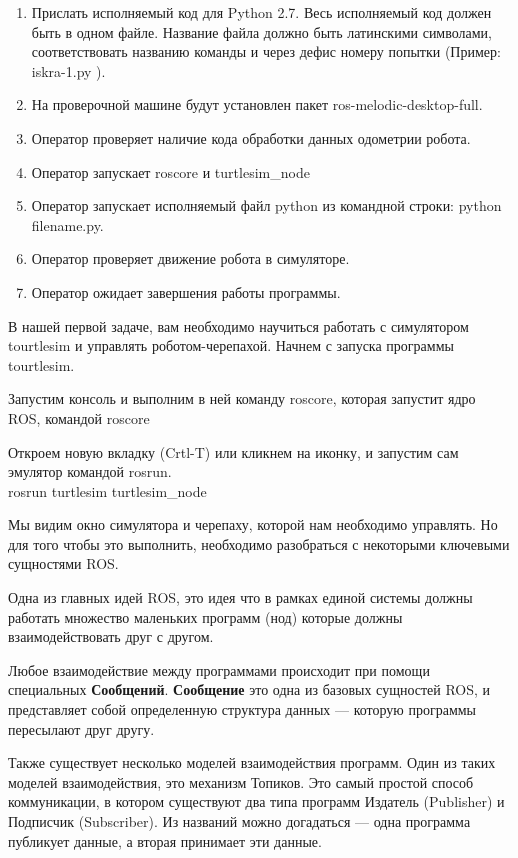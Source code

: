 \begin{enumerate}
    \item Прислать исполняемый код для Python 2.7. Весь исполняемый код должен быть в одном файле. Название файла должно быть латинскими символами, соответствовать названию команды и через дефис номеру попытки (Пример:  iskra-1.py ).
    \item На проверочной машине будут установлен пакет ros-melodic-desktop-full.
    \item Оператор проверяет наличие кода обработки данных одометрии робота.
    \item Оператор запускает roscore и turtlesim\_node
    \item Оператор запускает исполняемый файл python из командной строки: python filename.py.
    \item Оператор проверяет движение робота в симуляторе.
    \item Оператор ожидает завершения работы программы.
\end{enumerate}

\solutionSection

В нашей первой задаче, вам необходимо научиться работать с симулятором \linebreak tourtlesim и управлять роботом-черепахой. Начнем с запуска программы tourtlesim.

Запустим консоль и выполним в ней команду roscore, которая запустит ядро ROS, командой roscore

Откроем новую вкладку (Crtl-T) или кликнем на иконку, и запустим сам эмулятор командой rosrun.\\
rosrun turtlesim turtlesim\_node

Мы видим окно симулятора и черепаху, которой нам необходимо управлять. Но для того чтобы это выполнить, необходимо разобраться с некоторыми ключевыми сущностями ROS.

Одна из главных идей ROS, это идея что в рамках единой системы должны работать множество маленьких программ (нод) которые должны взаимодействовать друг с другом.

Любое взаимодействие между программами происходит при помощи специальных \textbf{Сообщений}. \textbf{Сообщение} это одна из базовых сущностей ROS, и представляет собой определенную структура данных — которую программы пересылают друг другу.

Также существует несколько моделей взаимодействия программ. Один из таких моделей взаимодействия, это механизм Топиков. Это самый простой способ коммуникации, в котором существуют два типа программ Издатель (Publisher) и Подписчик (Subscriber). Из названий можно догадаться — одна программа публикует данные, а вторая принимает эти данные.

